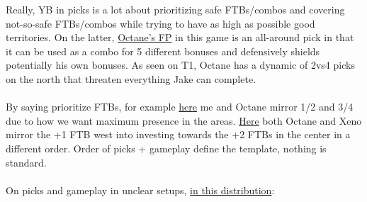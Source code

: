 Really, YB in picks is a lot about prioritizing safe FTBs/combos and covering not-so-safe FTBs/combos while trying to have as high as possible good territories. On the latter, \href{https://www.warzone.com/MultiPlayer?GameID=40069574}{Octane's FP} in this game is an all-around pick in that it can be used as a combo for 5 different bonuses and defensively shields potentially his own bonuses. As seen on T1, Octane has a dynamic of 2vs4 picks on the north that threaten everything Jake can complete.
\\
\\
By saying prioritize FTBs, for example \href{https://www.warzone.com/MultiPlayer?GameID=38982476}{here} me and Octane mirror 1/2 and 3/4 due to how we want maximum presence in the areas. \href{https://www.warzone.com/MultiPlayer?GameID=40721173}{Here} both Octane and Xeno mirror the +1 FTB west into investing towards the +2 FTBs in the center in a different order. Order of picks + gameplay define the template, nothing is standard.
\\
\\
On picks and gameplay in unclear setups, \href{https://www.warzone.com/MultiPlayer?GameID=35335475}{in this distribution}:
